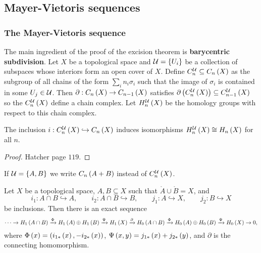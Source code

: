 \pagebreak

\subsection{Mayer-Vietoris sequences}

\subsubsection{The Mayer-Vietoris sequence}

The main ingredient of the proof of the excision theorem is \textbf{barycentric subdivision}. Let $ X $ be a topological space and $ \mathcal{U} = \left\{ U_i \right\} $ be a collection of subspaces whose interiors form an open cover of $ X $. Define $ C_n^{\mathcal{U}} \subseteq C_n\left( X \right) $ as the subgroup of all chains of the form $ \sum_i n_i\sigma_i $ such that the image of $ \sigma_i $ is contained in some $ U_j \in \mathcal{U} $. Then $ \partial : C_n\left( X \right) \to C_{n - 1}\left( X \right) $ satisfies $ \partial\left( C_n^{\mathcal{U}}\left( X \right) \right) \subseteq C_{n - 1}^{\mathcal{U}}\left( X \right) $ so the $ C_n^{\mathcal{U}}\left( X \right) $ define a chain complex. Let $ H_n^{\mathcal{U}}\left( X \right) $ be the homology groups with respect to this chain complex.

\begin{proposition}
The inclusion $ i : C_n^{\mathcal{U}}\left( X \right) \hookrightarrow C_n\left( X \right) $ induces isomorphisms $ H_n^{\mathcal{U}}\left( X \right) \cong H_n\left( X \right) $ for all $ n $.
\end{proposition}

\begin{proof}
Hatcher page $ 119 $.
\end{proof}

\begin{notation*}
If $ \mathcal{U} = \left\{ A, B \right\} $ we write $ C_n\left( A + B \right) $ instead of $ C_n^{\mathcal{U}}\left( X \right) $.
\end{notation*}

\begin{theorem}
Let $ X $ be a topological space, $ A, B \subseteq X $ such that $ \mathring{A} \cup \mathring{B} = X $, and
$$ i_1 : A \cap B \hookrightarrow A, \qquad i_2 : A \cap B \hookrightarrow B, \qquad j_1 : A \hookrightarrow X, \qquad j_2 : B \hookrightarrow X $$
be inclusions. Then there is an exact sequence
$$ \dots \to H_1\left( A \cap B \right) \xrightarrow{\Phi} H_1\left( A \right) \oplus H_1\left( B \right) \xrightarrow{\Psi} H_1\left( X \right) \xrightarrow{\partial} H_0\left( A \cap B \right) \xrightarrow{\Phi} H_0\left( A \right) \oplus H_0\left( B \right) \xrightarrow{\Psi} H_0\left( X \right) \to 0, $$
where $ \Phi\left( x \right) = \left( i_{1*}\left( x \right), -i_{2*}\left( x \right) \right) $, $ \Psi\left( x, y \right) = j_{1*}\left( x \right) + j_{2*}\left( y \right) $, and $ \partial $ is the connecting homomorphism.
\end{theorem}

